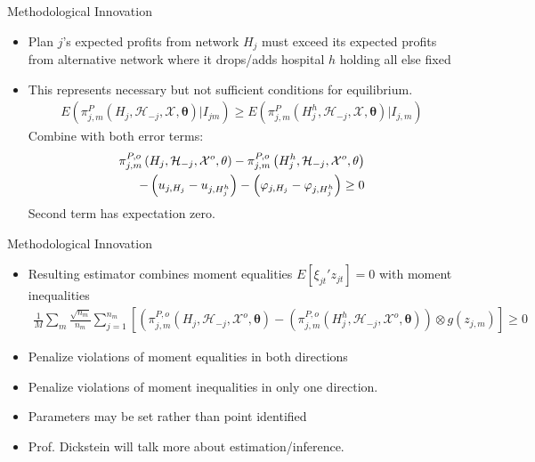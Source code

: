\documentclass[xcolor=pdftex,dvipsnames,table,mathserif,aspectratio=169]{beamer}
\begin{document}
\begin{frame}{Methodological Innovation}
\begin{itemize}
\item Plan $j$'s expected profits from network $H_j$ must exceed its expected profits from alternative network where it drops/adds hospital $h$ holding all else fixed
\item This represents \alert{necessary} but \alert{not sufficient} conditions for equilibrium.
\begin{align*}
E\left(\pi_{j, m}^{P}\left(H_{j}, \mathcal{H}_{-j}, \mathcal{X}, \boldsymbol{\theta}\right) | I_{j m}\right) \geq E\left(\pi_{j, m}^{P}\left(H_{j}^{h}, \mathcal{H}_{-j}, \mathcal{X}, \boldsymbol{\theta}\right) | I_{j, m}\right)
\end{align*}
Combine with both error terms:
\begin{align*}
\small
\pi_{j, m}^{P, o}\left(H_{j}, \mathcal{H}_{-j}, \mathcal{X}^{o}, \theta\right)-\pi_{j, m}^{P, o}\left(H_{j}^{h}, \mathcal{H}_{-j}, \mathcal{X}^{o}, \theta\right)\\
-\left(u_{j, H_{j}}-u_{j, H_{j}^{h}}\right)-\left(\varphi_{j, H_{j}}-\varphi_{j, H_{j}^{h}}\right) \geq 0
\end{align*}
Second term has expectation zero.
\end{itemize}
\end{frame}

\begin{frame}{Methodological Innovation}
\begin{itemize}
\item Resulting estimator combines \alert{moment equalities }$E[\xi_{jt}' z_{jt}]=0$ with \alert{moment inequalities}
\begin{align*}
\frac{1}{M} \sum_{m} \frac{\sqrt{n_{m}}}{n_{m}} \sum_{j=1}^{n_{m}}\left[\left(\pi_{j, m}^{P, o}\left(H_{j}, \mathcal{H}_{-j}, \mathcal{X}^{o}, \boldsymbol{\theta}\right)-\left(\pi_{j, m}^{P, o}\left(H_{j}^{h}, \mathcal{H}_{-j}, \mathcal{X}^{o}, \boldsymbol{\theta}\right)\right) \otimes g\left(z_{j, m}\right)\right] \geq 0\right.
\end{align*}
\item Penalize violations of moment equalities in both directions
\item Penalize violations of moment inequalities in only one direction.
\item Parameters may be \alert{set} rather than \alert{point identified}
\item Prof. Dickstein will talk more about estimation/inference.
\end{itemize}
\end{frame}
\end{document}
